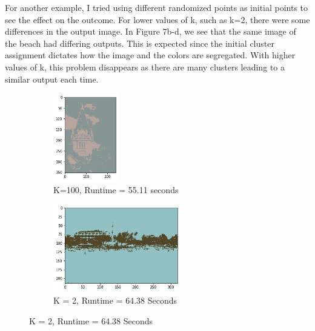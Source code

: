 \documentclass[twoside,10pt]{article}
\begin{document}
\begin{enumerate}
\begin{itemize}
  For another example, I tried using different randomized points as initial points to see the effect on the outcome. For lower values of k, such as k=2, there were some differences in the output image. In Figure 7b-d, we see that the same image of the beach had differing outputs. This is expected since the initial cluster assignment dictates how the image and the colors are segregated. With higher values of k, this problem disappears as there are many clusters leading to a similar output each time.
  
  \begin{figure}
\begin{subfigure}{.5\textwidth}
  \centering
  \includegraphics[height=1.5in]{Images/TechTowerSameInitPoints.png}  
  \caption{K=100, Runtime = 55.11 seconds}
  \label{fig:sub-first}
\end{subfigure}
\begin{subfigure}{.5\textwidth}
  \centering
  \includegraphics[height=1.5in]{Images/Beachkmedoids2.png}  
  \caption{K = 2, Runtime = 64.38 Seconds}
  \label{fig:sub-second}
\end{subfigure}


\end{figure}
\end{itemize}
\end{enumerate}
\end{document}
